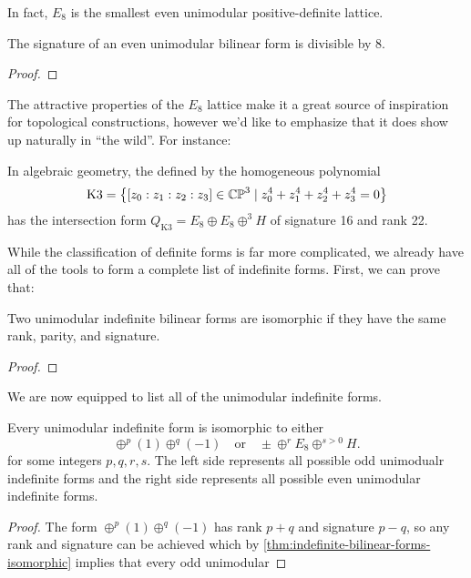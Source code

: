 In fact, $E_8$ is the smallest even unimodular positive-definite lattice.
\begin{theorem}
	The signature of an even unimodular bilinear form is divisible by $8$.
\end{theorem}
\begin{proof}
\end{proof}

The attractive properties of the $E_8$ lattice make it a great source of inspiration for topological constructions, however we'd like to emphasize that it does show up naturally in ``the wild''. For instance:

\begin{example}
	In algebraic geometry, the  defined by the homogeneous polynomial
	\[
		\textrm{K3} = \left\{ [z_0 : z_1 : z_2 : z_3]\in \mathbb{CP}^3 \mid z_0^4 + z_1^4+z_2^4 + z_3^4=0\right\}
	\]
	has the intersection form $Q_{\textrm{K3}} = E_8\oplus E_8 \oplus^3 H$ of signature 16 and rank 22.
\end{example}

While the classification of definite forms is far more complicated, we already have all of the tools to form a complete list of indefinite forms. First, we can prove that:

\begin{theorem}\label{thm:indefinite-bilinear-forms-isomorphic}
	Two unimodular indefinite bilinear forms are isomorphic if they have the same rank, parity, and signature.
\end{theorem}
\begin{proof}
\end{proof}

We are now equipped to list all of the unimodular indefinite forms.
\begin{proposition}
	Every unimodular indefinite form is isomorphic to either
	\[
		\oplus^p (1)\oplus^q (-1)
		\quad\textrm{or}\quad
		\pm \oplus^r E_8 \oplus^{s>0} H.
	\]
	for some integers $p,q,r,s$. The left side represents all possible odd unimodualr indefinite forms and the right side represents all possible even unimodular indefinite forms.
\end{proposition}
\begin{proof}
	The form $\oplus^p (1)\oplus^q(-1)$ has rank $p+q$ and signature $p-q$, so any rank and signature can be achieved which by \cref{thm:indefinite-bilinear-forms-isomorphic} implies that every odd unimodular 
\end{proof}



\medskip
{}

